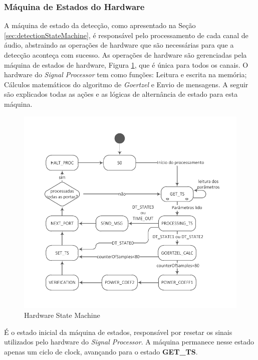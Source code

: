 \documentclass[monografia]{subfiles}
\begin{document}
		\subsubsection{Máquina de Estados do Hardware}
		\label{sec:HardwareStateMachine}
			A máquina de estado da detecção, como apresentado na Seção \ref{sec:detectionStateMachine}, é responsável pelo processamento de cada canal de
			áudio, abstraindo as operações de hardware que são necessárias para que a detecção aconteça com sucesso. 
			As operações de hardware são gerenciadas pela máquina de estados de hardware, Figura \ref{fig:hardwareStatemachine}, que é única para todos os canais.
			O hardware do \textit{Signal Processor} tem como funções: Leitura e escrita na memória; Cálculos matemáticos do algoritmo de \textit{Goertzel} e 
			Envio de mensagens. A seguir são explicados todas as ações e as lógicas de alternância de estado para esta máquina.

			\begin{figure}[!h]
			\centering
				\includegraphics[scale=1.25]{img/stateMachines/hwProcState.pdf}
			\caption{Hardware State Machine}
			\label{fig:hardwareStatemachine}
			\end{figure}

			\label{sec:hardwareStateS0}
				É o estado inicial da máquina de estados, responsável por resetar os sinais utilizados pelo hardware do \textit{Signal Processor}. A máquina
				permanece nesse estado apenas um ciclo de clock, avançando para o estado \textbf{GET\_TS}.
\end{document}
